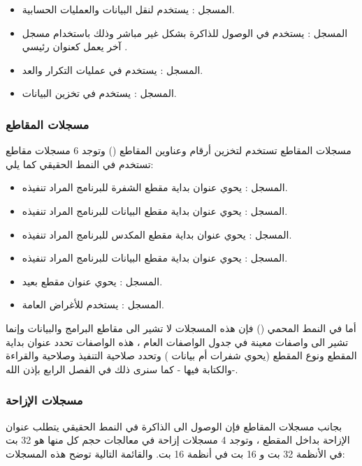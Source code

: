 \documentclass[document.tex]{subfiles}
\begin{document}
\begin{itemize}
\item المسجل : يستخدم لنقل البيانات والعمليات الحسابية.
\item المسجل : يستخدم في الوصول للذاكرة بشكل غير مباشر وذلك باستخدام مسجل آخر يعمل كعنوان رئيسي .
\item المسجل : يستخدم في عمليات التكرار والعد.
\item المسجل : يستخدم في تخزين البيانات.
\end{itemize}

\subsubsection{مسجلات المقاطع }
مسجلات المقاطع تستخدم لتخزين أرقام وعناوين المقاطع () وتوجد 6 مسجلات مقاطع تستخدم في النمط الحقيقي كما يلي:

\begin{itemize}
\item المسجل : يحوي عنوان بداية مقطع الشفرة للبرنامج المراد تنفيذه.
\item المسجل : يحوي عنوان بداية مقطع البيانات للبرنامج المراد تنفيذه.
\item المسجل : يحوي عنوان بداية مقطع المكدس للبرنامج المراد تنفيذه.
\item المسجل : يحوي عنوان بداية مقطع البيانات للبرنامج المراد تنفيذه.
\item المسجل : يحوي عنوان مقطع بعيد.
\item المسجل : يستخدم للأغراض العامة.
\end{itemize}

أما في النمط المحمي () فإن هذه المسجلات لا تشير الى مقاطع البرامج والبيانات وإنما تشير الى واصفات معينة في جدول الواصفات العام ، هذه الواصفات تحدد عنوان بداية المقطع ونوع المقطع (يحوي شفرات أم بيانات ) وتحدد صلاحية التنفيذ وصلاحية والقراءة والكتابة فيها - كما سنرى ذلك في الفصل الرابع بإذن الله-.

\subsubsection{مسجلات الإزاحة }
 بجانب مسجلات المقاطع فإن الوصول الى الذاكرة في النمط الحقيقي يتطلب عنوان الإزاحة بداخل المقطع ، وتوجد 4 مسجلات إزاحة في معالجات  حجم كل منها هو 32 بت في الأنظمة 32 بت و 16 بت في أنظمة 16 بت. والقائمة التالية توضح هذه المسجلات:
\end{document}
